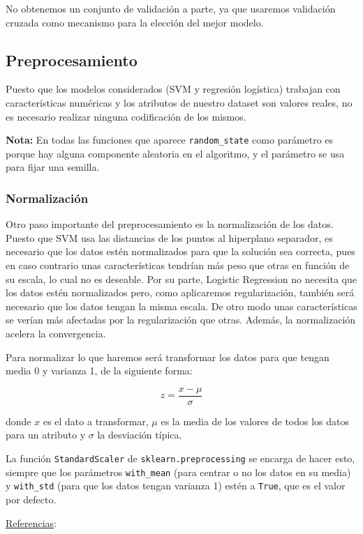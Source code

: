 \documentclass[a4]{article}
\begin{document}
No obtenemos un conjunto de validación a parte, ya que usaremos validación cruzada como mecanismo para la elección del mejor modelo. 

\subsection{Preprocesamiento}

Puesto que los modelos considerados (SVM y regresión logística) trabajan con características numéricas y los atributos de nuestro dataset son valores reales, no es necesario realizar ninguna codificación de los mismos. 


\textbf{Nota:} En todas las funciones que aparece \lstinline|random_state| como parámetro es porque hay alguna componente aleatoria en el algoritmo, y el parámetro se usa para fijar una semilla. 

\subsubsection{Normalización}
Otro paso importante del preprocesamiento es la normalización de los datos. Puesto que SVM usa las distancias de los puntos al hiperplano separador, es necesario que los datos estén normalizados para que la solución sea correcta, pues en caso contrario unas características tendrían más peso que otras en función de su escala, lo cual no es deseable. Por su parte, Logistic Regression no necesita que los datos estén normalizados pero, como aplicaremos regularización, también será necesario que los datos tengan la misma escala. De otro modo unas características se verían más afectadas por la regularización que otras. Además, la normalización acelera la convergencia. 

Para normalizar lo que haremos será transformar los datos para que tengan media 0 y varianza 1, de la siguiente forma:

$$z=\frac{x-\mu}{\sigma}$$

donde $x$ es el dato a transformar, $\mu$ es la media de los valores de todos los datos para un atributo y $\sigma$ la desviación típica. 

La función \lstinline|StandardScaler| de \lstinline|sklearn.preprocessing| se encarga de hacer esto, siempre que los parámetros \lstinline|with_mean| (para centrar o no los datos en su media) y \lstinline|with_std|
(para que los datos tengan varianza 1) estén a \lstinline|True|, que es el valor por defecto.

\underline{Referencias}:
\end{document}
